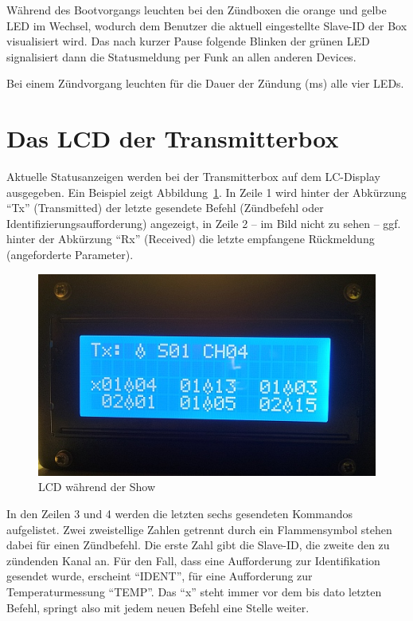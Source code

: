\documentclass[pdftex, parskip, numbers=noenddot, toc=listof]{scrbook}
\begin{document}
			Während des Bootvorgangs leuchten bei den Zündboxen die orange und gelbe LED im Wechsel, wodurch dem Benutzer die aktuell eingestellte Slave-ID der Box visualisiert wird. Das nach kurzer Pause folgende Blinken der grünen LED signalisiert dann die Statusmeldung per Funk an allen anderen Devices.

			Bei einem Zündvorgang leuchten für die Dauer der Zündung (\unit[11]{ms}) alle vier LEDs.

		\section{Das LCD der Transmitterbox}

			Aktuelle Statusanzeigen werden bei der Transmitterbox auf dem LC-Display ausgegeben. Ein Beispiel zeigt Abbildung~\ref{fig:senderanzeige}. In Zeile 1 wird hinter der Abkürzung \enquote{Tx} (Transmitted) der letzte gesendete Befehl (Zündbefehl oder Identifizierungsaufforderung) angezeigt, in Zeile 2 -- im Bild nicht zu sehen -- ggf. hinter der Abkürzung \enquote{Rx} (Received) die letzte empfangene Rückmeldung (angeforderte Parameter).

			\begin{figure}
				\centering
				\includegraphics[width=.7\textwidth]{Bilder/SenderAnzeige}
				\caption{LCD während der Show}
				\label{fig:senderanzeige}
			\end{figure}

			In den Zeilen 3 und 4 werden die letzten sechs gesendeten Kommandos aufgelistet. Zwei zweistellige Zahlen getrennt durch ein Flammensymbol stehen dabei für einen Zündbefehl. Die erste Zahl gibt die Slave-ID, die zweite den zu zündenden Kanal an. Für den Fall, dass eine Aufforderung zur Identifikation gesendet wurde, erscheint \enquote{IDENT}, für eine Aufforderung zur Temperaturmessung \enquote{TEMP}. Das \enquote{x} steht immer vor dem bis dato letzten Befehl, springt also mit jedem neuen Befehl eine Stelle weiter.
\end{document}
